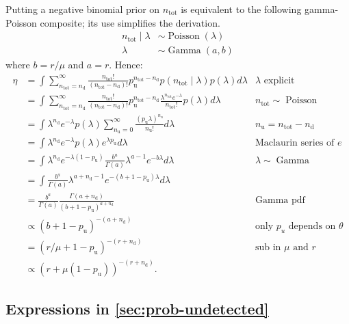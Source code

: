 \documentclass[12pt]{article}
\def\dist{\sim}
\DeclareMathOperator{\Poi}{Poisson}
\DeclareMathOperator{\GamDist}{Gamma}
\newcommand{\ntot}{n_\text{tot}}
\newcommand{\ndet}{n_\text{d}}
\newcommand{\nnodet}{n_\text{u}}
\newcommand{\pnodet}{p_\text{u}}
\begin{document}
Putting a negative binomial prior on $\ntot$ is equivalent to the following gamma-Poisson composite; its use simplifies the derivation.
\begin{align}
\ntot \mid \lambda &\dist \Poi(\lambda) \\
\lambda &\dist \GamDist(a, b)
\end{align}
where $b = r / \mu$ and $a = r$.
Hence:
\begin{align}
\eta
&= \int \sum_{\ntot=\ndet}^\infty \frac{\ntot!}{(\ntot-\ndet)!} \pnodet^{\ntot-\ndet} p(\ntot \mid \lambda) p(\lambda) d\lambda &\text{$\lambda$ explicit}\\
&= \int \sum_{\ntot=\ndet}^\infty \frac{\ntot!}{(\ntot-\ndet)!} \pnodet^{\ntot-\ndet} \frac{\lambda^{\ntot} e^{-\lambda}}{\ntot!} p(\lambda) d\lambda &\ntot \dist \Poi\\
&= \int \lambda^{\ndet} e^{-\lambda} p(\lambda) \sum_{\nnodet=0}^\infty \frac{(\pnodet \lambda)^{\nnodet}}{\nnodet!} d\lambda &\nnodet = \ntot-\ndet\\
&= \int \lambda^{\ndet} e^{-\lambda} p(\lambda) e^{\lambda \pnodet} d\lambda &\text{Maclaurin series of $e$} \\
&= \int \lambda^{\ndet} e^{-\lambda(1 - \pnodet)} \frac{b^a}{\Gamma(a)} \lambda^{a-1} e^{-b\lambda} d\lambda &\lambda \dist \GamDist\\
&= \int \frac{b^a}{\Gamma(a)} \lambda^{a+\ndet-1} e^{-(b+1-\pnodet)\lambda} d\lambda \\
&= \frac{b^a}{\Gamma(a)} \frac{\Gamma(a+\ndet)}{(b+1-\pnodet)^{a+\ndet}} &\text{Gamma pdf}\\
&\propto (b+1-\pnodet)^{-(a+\ndet)} &\text{only $p_u$ depends on $\theta$}\\
&= (r/\mu + 1 - \pnodet)^{-(r+\ndet)} &\text{sub in $\mu$ and $r$}\\
&\propto(r + \mu (1- \pnodet))^{-(r+\ndet)}.
\end{align}

\subsection{Expressions in \cref{sec:prob-undetected}}
\end{document}
